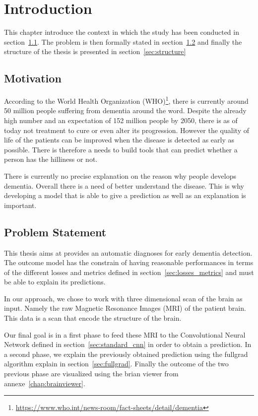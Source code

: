 \chapter{Introduction}
This chapter introduce the context in which the study has been conducted in section~\ref{sec:motivation}. The problem is then formally stated in section~\ref{sec:problem_statement} and finally the structure of the thesis is presented in section~\ref{sec:structure} 


\section{Motivation}
\label{sec:motivation}
According to the World Health Organization (WHO)\footnote{\href{https://www.who.int/news-room/fact-sheets/detail/dementia}{https://www.who.int/news-room/fact-sheets/detail/dementia}}, there is currently around 50 million people suffering from dementia around the word. Despite the already high number and an expectation of 152 million people by 2050, there is as of today not treatment to cure or even alter its progression. However the quality of life of the patients can be improved when the disease is detected as early as possible. There is therefore a needs to build tools that can predict whether a person has the hilliness or not.

There is currently no precise explanation on the reason why people develops dementia. Overall  there is a need of better understand the disease. This is why developing a model that is able to give a prediction as well as an explanation is important.  


\section{Problem Statement}
\label{sec:problem_statement}
This thesis aims at provides an automatic diagnoses for early dementia detection. The outcome model has the constrain of having reasonable performances in terms of the different losses and metrics defined in section~\ref{sec:losses_metrics} and must be able to explain its predictions.

In our approach, we chose to work with three dimensional scan of the brain as input. Namely the raw Magnetic Resonance Images (MRI) of the patient brain. This data is a scan that encode the structure of the brain. 

Our final goal is in a first phase to feed these MRI to the Convolutional Neural Network defined in section~\ref{sec:standard_cnn} in order to obtain a prediction. In a second phase, we explain the previously obtained prediction using the fullgrad algorithm explain in section~\ref{sec:fullgrad}. Finally the outcome of the two previous phase are visualized using the brian viewer from annexe~\ref{chap:brainviewer}.



